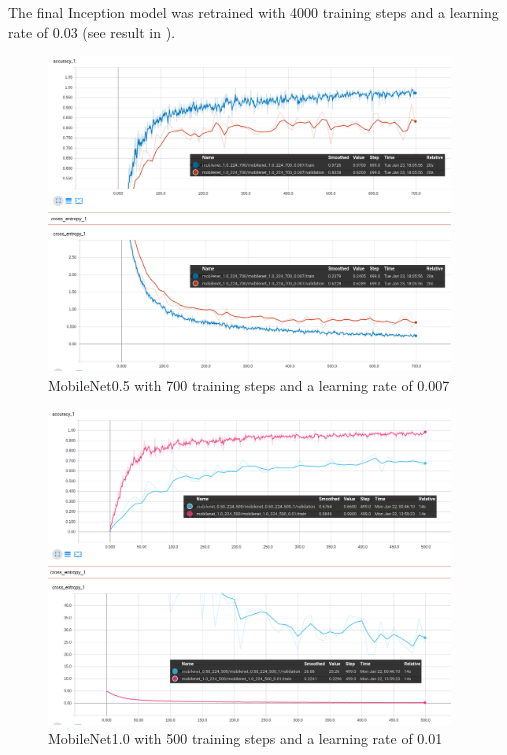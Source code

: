 The final Inception model was retrained with 4000 training steps and a learning rate of 0.03 (see result in ).

\begin{figure}[htbp]
\centering
\includegraphics[width=0.95\textwidth]{includes/MobileNet05-700res}
\caption[MobileNet0.5 with 700 training steps and a learning rate of 0.007]{MobileNet0.5 with 700 training steps and a learning rate of 0.007}
\label{fig:MobileNet05-700res}
\end{figure}

\begin{figure}[htbp]
\centering
\includegraphics[width=0.95\textwidth]{includes/MobileNet10-500res}
\caption[MobileNet1.0 with 500 training steps and a learning rate of 0.01]{MobileNet1.0 with 500 training steps and a learning rate of 0.01}
\label{fig:MobileNet10-500res}
\end{figure}

